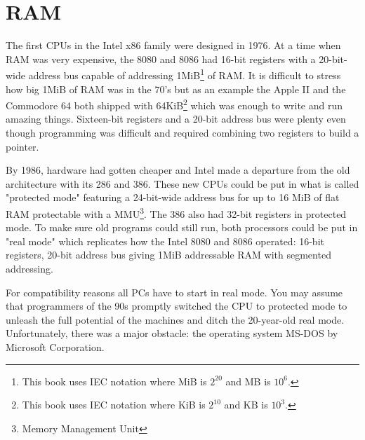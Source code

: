 \documentclass[book.tex]{subfiles}
\begin{document}
\section{RAM}
The first CPUs in the Intel x86 family were designed in 1976. At a time when RAM was very expensive, the 8080 and 8086 had 16-bit registers with a 20-bit-wide address bus capable of addressing 1MiB\footnote{This book uses IEC notation where MiB is $2^{20}$ and MB is $10^6$.} of RAM. It is difficult to stress how big 1MiB of RAM was in the 70's but as an example the Apple II and the Commodore 64 both shipped with 64KiB\footnote{This book uses IEC notation where KiB is $2^{10}$ and KB is $10^3$.} which was enough to write and run amazing things. Sixteen-bit registers and a 20-bit address bus were plenty even though programming was difficult and required combining two registers to build a pointer.\\
\par
By 1986, hardware had gotten cheaper and Intel made a departure from the old architecture with its 286 and 386. These new CPUs could be put in what is called "protected mode" featuring a 24-bit-wide address bus for up to 16 MiB of flat RAM protectable with a MMU\footnote{Memory Management Unit}. The 386 also had 32-bit registers in protected mode. To make sure old programs could still run, both processors could be put in "real mode" which replicates how the Intel 8080 and 8086 operated: 16-bit registers, 20-bit address bus giving 1MiB addressable RAM with segmented addressing.\\
\par
For compatibility reasons all PCs have to start in real mode. You may assume that programmers of the 90s promptly switched the CPU to protected mode to unleash the full potential of the machines and ditch the 20-year-old real mode. Unfortunately, there was a major obstacle: the operating system MS-DOS by Microsoft Corporation.
  
\end{document}

